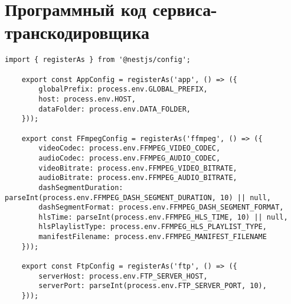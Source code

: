 \chapter{Программный код сервиса-транскодировщика}

\begin{lstlisting}[caption={config.ts}]
	import { registerAs } from '@nestjs/config';
	
	export const AppConfig = registerAs('app', () => ({
		globalPrefix: process.env.GLOBAL_PREFIX,
		host: process.env.HOST,
		dataFolder: process.env.DATA_FOLDER,
	}));
	
	export const FFmpegConfig = registerAs('ffmpeg', () => ({
		videoCodec: process.env.FFMPEG_VIDEO_CODEC,
		audioCodec: process.env.FFMPEG_AUDIO_CODEC,
		videoBitrate: process.env.FFMPEG_VIDEO_BITRATE,
		audioBitrate: process.env.FFMPEG_AUDIO_BITRATE,
		dashSegmentDuration: parseInt(process.env.FFMPEG_DASH_SEGMENT_DURATION, 10) || null,
		dashSegmentFormat: process.env.FFMPEG_DASH_SEGMENT_FORMAT,
		hlsTime: parseInt(process.env.FFMPEG_HLS_TIME, 10) || null,
		hlsPlaylistType: process.env.FFMPEG_HLS_PLAYLIST_TYPE,
		manifestFilename: process.env.FFMPEG_MANIFEST_FILENAME
	}));
	
	export const FtpConfig = registerAs('ftp', () => ({
		serverHost: process.env.FTP_SERVER_HOST,
		serverPort: parseInt(process.env.FTP_SERVER_PORT, 10),
	}));
\end{lstlisting}

